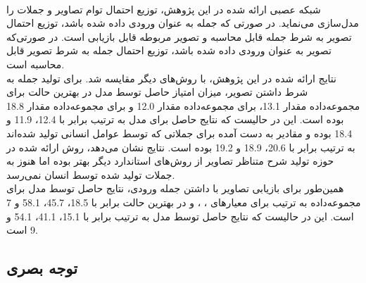 \\
شبکه عصبی ارائه شده در این پژوهش، توزیع احتمال توام تصاویر و جملات را مدل‌سازی می‌نماید. در صورتی که جمله به عنوان ورودی داده شده باشد، توزیع احتمال تصویر به شرط جمله قابل محاسبه و تصویر مربوطه قابل بازیابی است. در صورتی‌که تصویر به عنوان ورودی داده شده باشد، توزیع احتمال جمله به شرط تصویر قابل محاسبه است.
\\
نتایج ارائه شده در این پژوهش، با روش‌های دیگر مقایسه شد. برای تولید جمله به شرط داشتن تصویر، میزان امتیاز  حاصل توسط مدل در بهترین حالت برای مجموعه‌داده  مقدار 13.1، برای مجموعه‌داده  مقدار 12.0 و برای مجموعه‌داده  مقدار 18.8 بوده است. این در حالیست که نتایج حاصل برای مدل  به ترتیب برابر با 12.4، 11.9 و 18.4 بوده و مقادیر به دست آمده برای جملاتی که توسط عوامل انسانی تولید شده‌اند به ترتیب برابر با 20.6، 18.9 و 19.2 بوده است. نتایج نشان می‌دهد، روش ارائه شده در حوزه تولید شرح متناظر تصاویر از روش‌های استاندارد دیگر بهتر بوده اما هنوز به جملات تولید شده توسط انسان نمی‌رسد.
\\
همین‌طور برای بازیابی تصاویر با داشتن جمله ورودی، نتایج حاصل توسط مدل برای مجموعه‌داده‌  به ترتیب برای معیارهای ، ،   و  در بهترین حالت برابر با 18.5، 45.7، 58.1 و 7 است. این در حالیست که نتایج حاصل توسط مدل  به ترتیب برابر با 15.1، 41.1، 54.1 و 9 است.

\subsection{توجه بصری}

